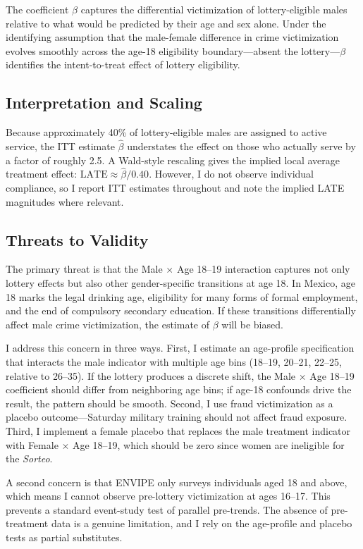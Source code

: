\documentclass[12pt]{article}
\begin{document}
The coefficient $\beta$ captures the differential victimization of lottery-eligible males relative to what would be predicted by their age and sex alone. Under the identifying assumption that the male-female difference in crime victimization evolves smoothly across the age-18 eligibility boundary---absent the lottery---$\beta$ identifies the intent-to-treat effect of lottery eligibility.

\subsection{Interpretation and Scaling}

Because approximately 40\% of lottery-eligible males are assigned to active service, the ITT estimate $\hat{\beta}$ understates the effect on those who actually serve by a factor of roughly 2.5. A Wald-style rescaling gives the implied local average treatment effect: $\text{LATE} \approx \hat{\beta} / 0.40$. However, I do not observe individual compliance, so I report ITT estimates throughout and note the implied LATE magnitudes where relevant.

\subsection{Threats to Validity}

The primary threat is that the Male $\times$ Age 18--19 interaction captures not only lottery effects but also other gender-specific transitions at age 18. In Mexico, age 18 marks the legal drinking age, eligibility for many forms of formal employment, and the end of compulsory secondary education. If these transitions differentially affect male crime victimization, the estimate of $\beta$ will be biased.

I address this concern in three ways. First, I estimate an age-profile specification that interacts the male indicator with multiple age bins (18--19, 20--21, 22--25, relative to 26--35). If the lottery produces a discrete shift, the Male $\times$ Age 18--19 coefficient should differ from neighboring age bins; if age-18 confounds drive the result, the pattern should be smooth. Second, I use fraud victimization as a placebo outcome---Saturday military training should not affect fraud exposure. Third, I implement a female placebo that replaces the male treatment indicator with Female $\times$ Age 18--19, which should be zero since women are ineligible for the \textit{Sorteo}.

A second concern is that ENVIPE only surveys individuals aged 18 and above, which means I cannot observe pre-lottery victimization at ages 16--17. This prevents a standard event-study test of parallel pre-trends. The absence of pre-treatment data is a genuine limitation, and I rely on the age-profile and placebo tests as partial substitutes.
\end{document}
